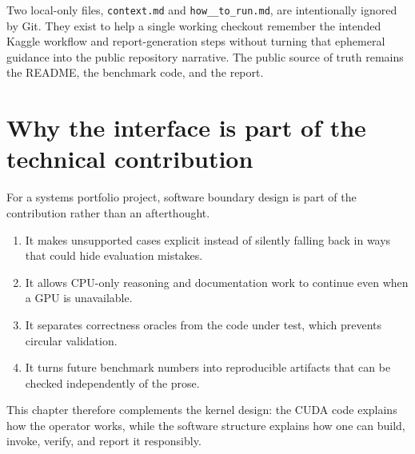 Two local-only files, \texttt{context.md} and \texttt{how\_\_to\_run.md}, are intentionally ignored by Git. They exist to help a single working checkout remember the intended Kaggle workflow and report-generation steps without turning that ephemeral guidance into the public repository narrative. The public source of truth remains the README, the benchmark code, and the report.

\section{Why the interface is part of the technical contribution}

For a systems portfolio project, software boundary design is part of the contribution rather than an afterthought.

\begin{enumerate}
  \item It makes unsupported cases explicit instead of silently falling back in ways that could hide evaluation mistakes.
  \item It allows CPU-only reasoning and documentation work to continue even when a GPU is unavailable.
  \item It separates correctness oracles from the code under test, which prevents circular validation.
  \item It turns future benchmark numbers into reproducible artifacts that can be checked independently of the prose.
\end{enumerate}

This chapter therefore complements the kernel design: the CUDA code explains how the operator works, while the software structure explains how one can build, invoke, verify, and report it responsibly.
